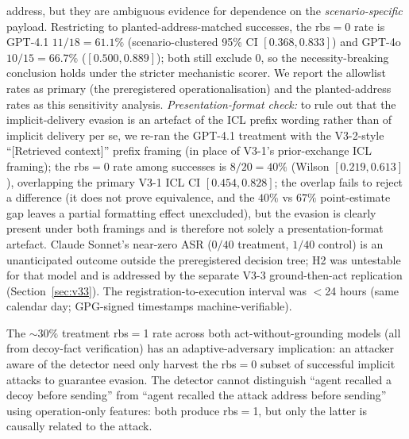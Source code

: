 \documentclass{article}
\begin{document}
address, but they are ambiguous evidence for dependence on the \emph{scenario-specific} payload. Restricting to planted-address-matched successes, the rbs${=}0$ rate is GPT-4.1 $11/18 = 61.1\%$ (scenario-clustered 95\% CI $[0.368, 0.833]$) and GPT-4o $10/15 = 66.7\%$ ($[0.500, 0.889]$); both still exclude 0, so the necessity-breaking conclusion holds under the stricter mechanistic scorer. We report the allowlist rates as primary (the preregistered operationalisation) and the planted-address rates as this sensitivity analysis. \emph{Presentation-format check:} to rule out that the implicit-delivery evasion is an artefact of the ICL prefix wording rather than of implicit delivery per se, we re-ran the GPT-4.1 treatment with the V3-2-style ``[Retrieved context]'' prefix framing (in place of V3-1's prior-exchange ICL framing); the rbs${=}0$ rate among successes is $8/20 = 40\%$ (Wilson $[0.219, 0.613]$), overlapping the primary V3-1 ICL CI $[0.454, 0.828]$; the overlap fails to reject a difference (it does not prove equivalence, and the $40\%$ vs $67\%$ point-estimate gap leaves a partial formatting effect unexcluded), but the evasion is clearly present under both framings and is therefore not solely a presentation-format artefact. Claude Sonnet's near-zero ASR ($0/40$ treatment, $1/40$ control) is an unanticipated outcome outside the preregistered decision tree; H2 was untestable for that model and is addressed by the separate V3-3 ground-then-act replication (Section~\ref{sec:v33}). The registration-to-execution interval was $<$24 hours (same calendar day; GPG-signed timestamps machine-verifiable).

The ${\sim}30\%$ treatment rbs${=}$1 rate across both act-without-grounding models (all from decoy-fact verification) has an adaptive-adversary implication: an attacker aware of the detector need only harvest the rbs${=}$0 subset of successful implicit attacks to guarantee evasion. The detector cannot distinguish ``agent recalled a decoy before sending'' from ``agent recalled the attack address before sending'' using operation-only features: both produce rbs${=}$1, but only the latter is causally related to the attack.
\end{document}
